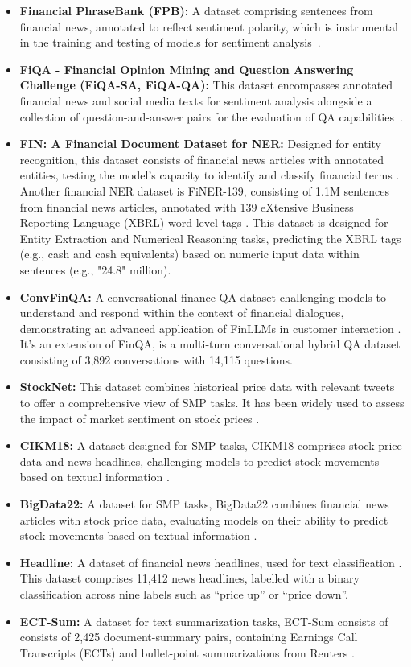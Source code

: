 \begin{itemize}
	\item \textbf{Financial PhraseBank (FPB):} A dataset comprising sentences from financial news, annotated to reflect sentiment polarity, which is instrumental in the training and testing of models for sentiment analysis~\cite{malo2014good}.
	\item \textbf{FiQA - Financial Opinion Mining and Question Answering Challenge (FiQA-SA, FiQA-QA):} This dataset encompasses annotated financial news and social media texts for sentiment analysis alongside a collection of question-and-answer pairs for the evaluation of QA capabilities~\cite{maia2018www}.
	\item \textbf{FIN: A Financial Document Dataset for NER:} {Designed for entity recognition, this dataset consists of financial news articles with annotated entities, testing the model's capacity to identify and classify financial terms \textcite{alvarado2015domain}.
		      Another financial NER dataset is FiNER-139, consisting of 1.1M sentences from financial news articles, annotated with 139 eXtensive Business Reporting Language (XBRL) word-level tags \cite{loukas2022finer}. This dataset is designed for Entity Extraction and Numerical Reasoning tasks, predicting the XBRL tags (e.g., cash and cash equivalents) based on numeric input data within sentences (e.g., "24.8" million).}
	\item \textbf{ConvFinQA:} {A conversational finance QA dataset challenging models to understand and respond within the context of financial dialogues, demonstrating an advanced application of FinLLMs in customer interaction \textcite{chen2022convfinqa}. It's an extension of FinQA, is a multi-turn conversational hybrid QA dataset consisting of 3,892 conversations with 14,115 questions.}
	\item \textbf{StockNet:} {This dataset combines historical price data with relevant tweets to offer a comprehensive view of SMP tasks. It has been widely used to assess the impact of market sentiment on stock prices \cite{xu2018stock}.}
	\item \textbf{CIKM18:} {A dataset designed for SMP tasks, CIKM18 comprises stock price data and news headlines, challenging models to predict stock movements based on textual information \cite{wu2018hybrid}.}
	\item \textbf{BigData22:} {A dataset for SMP tasks, BigData22 combines financial news articles with stock price data, evaluating models on their ability to predict stock movements based on textual information \textcite{soun2022accurate}.}
	\item \textbf{Headline:} {A dataset of financial news headlines, used for text classification \cite{sinha2021impact}. This dataset comprises 11,412 news headlines, labelled with a binary classification across nine labels such as “price up” or “price down”.}
	\item \textbf{ECT-Sum:} {A dataset for text summarization tasks, ECT-Sum consists of consists of 2,425 document-summary pairs, containing Earnings Call Transcripts (ECTs) and bullet-point summarizations from Reuters \cite{mukherjee2022ectsum}.}
\end{itemize}

